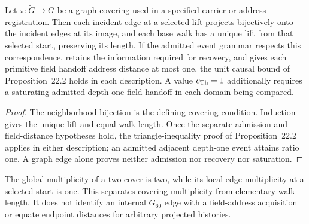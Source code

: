 \begin{proposition}\label{prop:coverlocality}
Let $\pi:\widetilde G\to G$ be a graph covering used in a specified carrier or address registration. Then each incident edge at a selected lift projects bijectively onto the incident edges at its image, and each base walk has a unique lift from that selected start, preserving its length. If the admitted event grammar respects this correspondence, retains the information required for recovery, and gives each primitive field handoff address distance at most one, the unit causal bound of Proposition~22.2 holds in each description. A value $c_{\mathrm{Th}}=1$ additionally requires a saturating admitted depth-one field handoff in each domain being compared.
\end{proposition}
\begin{proof}
The neighborhood bijection is the defining covering condition. Induction gives the unique lift and equal walk length. Once the separate admission and field-distance hypotheses hold, the triangle-inequality proof of Proposition~22.2 applies in either description; an admitted adjacent depth-one event attains ratio one. A graph edge alone proves neither admission nor recovery nor saturation.
\end{proof}
The global multiplicity of a two-cover is two, while its local edge multiplicity at a selected start is one. This separates covering multiplicity from elementary walk length. It does not identify an internal $G_{60}$ edge with a field-address acquisition or equate endpoint distances for arbitrary projected histories.
